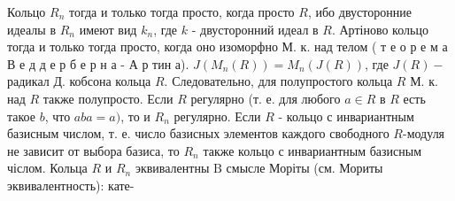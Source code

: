 \documentclass[10pt]{article}
\begin{document}
Кольцо $R_{n}$ тогда и только тогда просто, когда просто $R$, ибо двусторонние идеалы в $R_{n}$ имеют вид $k_{n}$, где $k$ - двусторонний идеал в $R$. Артіново кольцо тогда и только тогда просто, когда оно изоморфно М. к. над телом ( т е о р е м а В е д д е р б е р н а - А р тин а). $J\left(M_{n}(R)\right)=M_{n}(J(R))$, где $J(R)-$ радикал Д. кобсона кольца $R$. Следовательно, для полупростого кольца $R$ М. к. над $R$ также полупросто. Если $R$ регулярно (т. е. для любого $a \in R$ в $R$ есть такое $b$, что $a b a=a)$, то и $R_{n}$ регулярно. Если $R$ - кольцо с инвариантным базисным числом, т. е. число базисных элементов каждого свободного $R$-модуля не зависит от выбора базиса, то $R_{n}$ также кольцо с инвариантным базисным чіслом. Кольца $R$ и $R_{n}$ эквивалентны $\mathrm{B}$ смысле Моріты (см. Мориты эквивалентность): кате-
\end{document}

